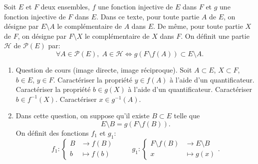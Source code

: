 Soit $E$ et $F$ deux ensembles, $f$ une fonction injective de $E$ dans $F$ et $g$ une fonction injective de $F$ dans $E$.\newline
Dans ce texte, pour toute partie $A$ de $E$, on désigne par $E\setminus A$ le complémentaire de $A$ dans $E$. De même, pour toute partie $X$ de $F$, on désigne par $F\setminus X$ le complémentaire de $X$ dans $F$.\newline
On définit une partie $\mathcal{H}$ de $\mathcal{P}(E)$ par:
\begin{displaymath}
  \forall A \in \mathcal{P}(E), \; 
  A\in \mathcal{H} \Leftrightarrow g(F\setminus f(A)) \subset E \setminus A .
\end{displaymath}

\begin{enumerate}
  \item Question de cours (image directe, image réciproque).\newline
  Soit $A\subset E$, $X\subset F$, $b\in E$, $y\in F$.\newline
  Caractériser la propriété $y\in f(A)$ à l'aide d'un quantificateur. Caractériser la propriété $b\in g(X)$ à l'aide d'un quantificateur. Caractériser $b\in f^{-1}(X)$. Caractériser $x\in g^{-1}(A)$.
  
  \item Dans cette question, on suppose qu'il existe $B\subset E$ telle que 
\begin{displaymath}
  E\setminus B = g(F\setminus f(B)).
\end{displaymath}
On définit des fonctions $f_1$ et $g_1$:
\begin{displaymath}
  f_1:
\left\lbrace 
\begin{aligned}
  B &\rightarrow f(B)\\ b &\mapsto f(b)
\end{aligned}
\right. 
\hspace{1cm}
  g_1:
\left\lbrace 
\begin{aligned}
  F \setminus f(B) &\rightarrow E\setminus B \\ x &\mapsto g(x)
\end{aligned}
\right. .
\end{displaymath}


\end{enumerate}
